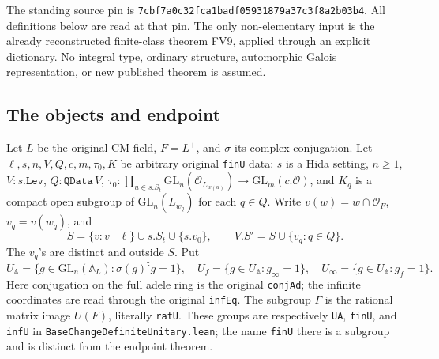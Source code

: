 \documentclass[11pt,a4paper]{article}
\numberwithin{equation}{section}
\theoremstyle{remark}\newtheorem{remark}[theorem]{Remark}
\begin{document}
The standing source pin is
\texttt{7cbf7a0c32fca1badf05931879a37c3f8a2b03b4}.
All definitions below are read at that pin.  The only non-elementary input
is the already reconstructed finite-class theorem FV9, applied through an
explicit dictionary.  No integral type, ordinary structure, automorphic
Galois representation, or new published theorem is assumed.

\subsection{The objects and endpoint}

Let \(L\) be the original CM field, \(F=L^+\), and \(\sigma\) its complex
conjugation.  Let \(\ell,\allowbreak{} s,\allowbreak{} n,\allowbreak{} V,\allowbreak{} Q,\allowbreak{} c,\allowbreak{} m,\tau _0,\allowbreak{} K\) be arbitrary original
\texttt{fin\allowbreak U} data: \(s\) is a Hida setting, \(n\ge1\),
\(V:s.\texttt{Lev}\), \(Q:\texttt{QData}\,\allowbreak{} V\),
\(\tau _0:\prod_{u\in s.S_t}\mathrm{GL}_n(\mathcal O_{L_{w(u)}})
\to\mathrm{GL}_m(c.\mathcal O)\), and \(K_q\) is a compact open
subgroup of \(\mathrm{GL}_n(L_{w_q})\) for each \(q\in Q\).
Write \(v(w)=w\cap\mathcal O_F\), \(v_q=v(w_q)\), and
\[
 S=\{v:v\mid\ell\}\cup s.S_t\cup\{s.v_0\},\qquad
 V.S'=S\cup\{v_q:q\in Q\}.
\]
The \(v_q\)'s are distinct and outside \(S\).  Put
\[
 U_{\mathbb A}=\{g\in\mathrm{GL}_n(\mathbb A_L):
                  \sigma(g)^{\mathsf t}g=1\},\quad
 U_f=\{g\in U_{\mathbb A}:g_\infty=1\},\quad
 U_\infty=\{g\in U_{\mathbb A}:g_f=1\}.
\]
Here conjugation on the full adele ring is the original
\texttt{conj\allowbreak Ad}; the infinite coordinates are read through the original
\texttt{inf\allowbreak Eq}.  The subgroup \(\Gamma\) is the rational matrix image
\(U(F)\), literally \texttt{rat\allowbreak U}.  These groups are respectively
\texttt{UA}, \texttt{fin\allowbreak U}, and \texttt{inf\allowbreak U} in
\texttt{Base\allowbreak Change\allowbreak Definite\allowbreak Unitary.\allowbreak lean}; the name \texttt{fin\allowbreak U} there
is a subgroup and is distinct from the endpoint theorem.
\end{document}
